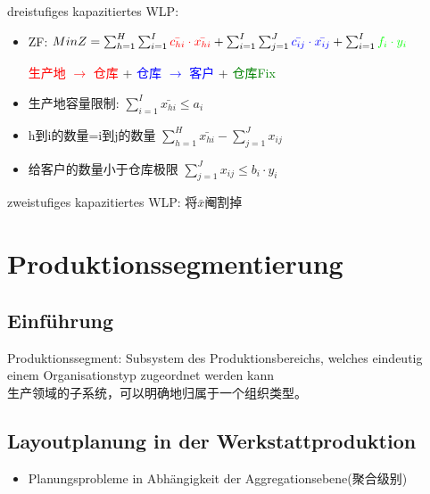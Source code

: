\documentclass[12pt, letterpaper]{article}
\begin{document}
\begin{CJK*}{UTF8}{gbsn}
\begin{flushleft}
dreistufiges kapazitiertes WLP:
\end{flushleft}

 \begin{itemize}
 \item  ZF: $Min Z =   \sum_{h=1}^{H} \sum_{i=1}^{I} \textcolor{red}{ \bar{c_{hi}} \cdot \bar{x_{hi}}} +
  \sum_{i=1}^{I} \sum_{j=1}^{J} \textcolor{blue}{\bar{c_{ij}} \cdot \bar{x_{ij}} }+ 
  \sum_{i=1}^{I} \textcolor{green}{ f_i \cdot y_i}$


 
\begin{center}
\textcolor{red}{生产地 $\rightarrow$ 仓库} + \textcolor{blue}{仓库 $\rightarrow$ 客户} +  \textcolor{green}{仓库Fix}
\end{center}

\item 生产地容量限制: $\sum_{i=1}^{I}\bar{x_{hi}}\leq a_i$

\item h到i的数量=i到j的数量 $\sum_{h=1}^{H}\bar{x_{hi}} - 
\sum_{j=1}^{J} x_{ij}$

\item 给客户的数量小于仓库极限 $\sum_{j=1}^{J}x_{ij} \leq b_i \cdot y_i$

\end{itemize}

\begin{flushleft}
zweistufiges kapazitiertes WLP: 将$\bar{x}$阉割掉
\end{flushleft}





\newpage
\section{Produktionssegmentierung}
\subsection{Einführung}
Produktionssegment: Subsystem des Produktionsbereichs, welches eindeutig einem Organisationstyp zugeordnet
werden kann\\[1mm]
生产领域的子系统，可以明确地归属于一个组织类型。


\subsection{Layoutplanung in der Werkstattproduktion}
\begin{itemize}
\item Planungsprobleme in Abhängigkeit der Aggregationsebene(聚合级别)


\end{itemize}
\end{CJK*}
\end{document}
